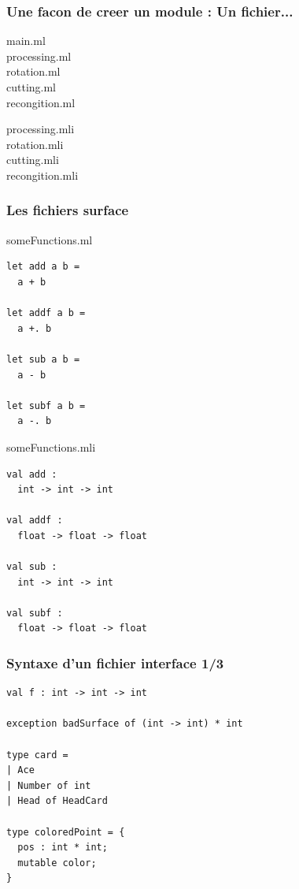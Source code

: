 \begin{frame}
	\frametitle{Une facon de creer un module : Un fichier...}
	\begin{center}
		\begin{minipage}{0.5\textwidth}
			main.ml\\
			processing.ml\\
			rotation.ml\\
			cutting.ml\\
			recongition.ml
		\end{minipage}
		\begin{minipage}{0.4\textwidth}
			processing.mli\\
			rotation.mli\\
			cutting.mli\\
			recongition.mli
		\end{minipage}
	\end{center}
\end{frame}

\begin{frame}[fragile]
	\frametitle{Les fichiers surface}
	\begin{center}
		\begin{minipage}{0.34\textwidth}
			someFunctions.ml
			\begin{lstlisting}
let add a b = 
  a + b

let addf a b = 
  a +. b

let sub a b = 
  a - b

let subf a b = 
  a -. b
			\end{lstlisting}
		\end{minipage}
		\begin{minipage}{0.5\textwidth}
			someFunctions.mli
			\begin{lstlisting}
val add : 
  int -> int -> int

val addf : 
  float -> float -> float

val sub :
  int -> int -> int

val subf :
  float -> float -> float
			\end{lstlisting}
		\end{minipage}
	\end{center}
\end{frame}

\begin{frame}[fragile]
	\frametitle{Syntaxe d'un fichier interface 1/3}
	\lstset{basicstyle=\small}
	\begin{lstlisting}
val f : int -> int -> int

exception badSurface of (int -> int) * int

type card =
| Ace
| Number of int
| Head of HeadCard

type coloredPoint = {
  pos : int * int;
  mutable color;
}
	\end{lstlisting}
\end{frame}


